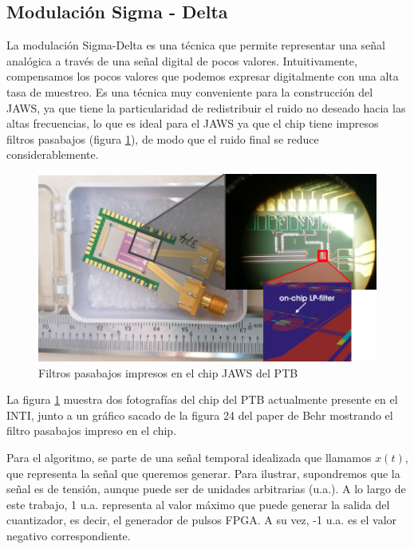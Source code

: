 \documentclass[twoside]{article}
\begin{document}
\begin{multicols}{2}




\subsection{Modulación Sigma - Delta}

La modulación Sigma-Delta \cite{delarosa2011} \cite{aziz1996} es una técnica que permite representar una señal analógica a través de una señal digital de pocos valores. Intuitivamente, compensamos los pocos valores que podemos expresar digitalmente con una alta tasa de muestreo. Es una técnica muy conveniente para la construcción del JAWS, ya que tiene la particularidad de redistribuir el ruido no deseado hacia las altas frecuencias, lo que es ideal para el JAWS ya que el chip tiene impresos filtros pasabajos (figura \ref{fig:LPF}), de modo que el ruido final se reduce considerablemente.

\begin{figure}[H]
\centering
\includegraphics[width=\linewidth]{figuras/filtroLP.png}
\caption{Filtros pasabajos impresos en el chip JAWS del PTB}
\label{fig:LPF}
\end{figure}

La figura \ref{fig:LPF} muestra dos fotografías del chip del PTB actualmente presente en el INTI, junto a un gráfico sacado de la figura 24 del paper de Behr \cite{behr2012} mostrando el filtro pasabajos impreso en el chip.


Para el algoritmo, se parte de una señal temporal idealizada que llamamos $x(t)$, que representa la señal que queremos generar. Para ilustrar, supondremos que la señal es de tensión, aunque puede ser de unidades arbitrarias (u.a.). A lo largo de este trabajo, 1 u.a. representa al valor máximo que puede generar la salida del cuantizador, es decir, el generador de pulsos FPGA. A su vez, -1 u.a. es el valor negativo correspondiente.


\end{multicols}
\end{document}
